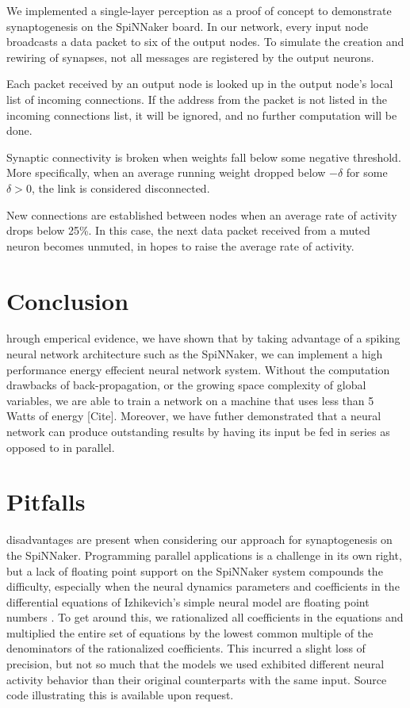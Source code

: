 \documentclass[journal]{./sty/IEEEtran}
\begin{document}
We implemented a single-layer perception as a proof of concept to demonstrate synaptogenesis on the SpiNNaker board. In our network, every input node broadcasts a data packet to six of the output nodes. To simulate the creation and rewiring of synapses, not all messages are registered by the output neurons. 

Each packet received by an output node is looked up in the output node's local list of incoming connections. If the address from the packet is not listed in the incoming connections list, it will be ignored, and no further computation will be done.

Synaptic connectivity is broken when weights fall below some negative threshold. More specifically, when an average running weight dropped below \(-\delta\) for some \(\delta > 0\), the link is considered disconnected.

New connections are established between nodes when an average rate of activity drops below 25\%. In this case, the next data packet received from a muted neuron becomes unmuted, in hopes to raise the average rate of activity.

\section{Conclusion}
hrough emperical evidence, we have shown that by taking advantage of a spiking neural network architecture such as the SpiNNaker, 
we can implement a high performance energy effecient neural network system. 
Without the computation drawbacks of back-propagation, or the growing space complexity of global variables, 
we are able to train a network on a machine that uses less than 5 Watts of energy [Cite].
Moreover, we have futher demonstrated that a neural network can produce outstanding results by having its input be fed in series as opposed to in parallel.



\section{Pitfalls}
 disadvantages are present when considering our approach 
for synaptogenesis on the SpiNNaker. 
Programming parallel applications is a challenge in its own right, 
but a lack of floating point support on the 
SpiNNaker system \cite{ArchOverV:Furber} compounds the difficulty, 
especially when the neural dynamics parameters and coefficients in the differential equations 
of Izhikevich's simple neural model are floating point numbers \cite{Spikes:Izhi}. 
To get around this, we rationalized all coefficients in the equations and multiplied the 
entire set of equations by the lowest common multiple of the denominators of 
the rationalized coefficients. 
This incurred a slight loss of precision, but not so much that the models we 
used exhibited different neural activity behavior than their original counterparts 
with the same input. 
Source code illustrating this is available upon request.
\end{document}
